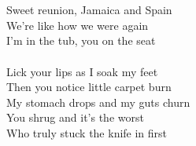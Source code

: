 \\
 \\
Sweet reunion, Jamaica and Spain \\
We're like how we were again \\
I'm in the tub, you on the seat \\
\\
Lick your lips as I soak my feet \\
Then you notice little carpet burn \\
My stomach drops and my guts churn \\
You shrug and it's the worst \\
Who truly stuck the knife in first \\
